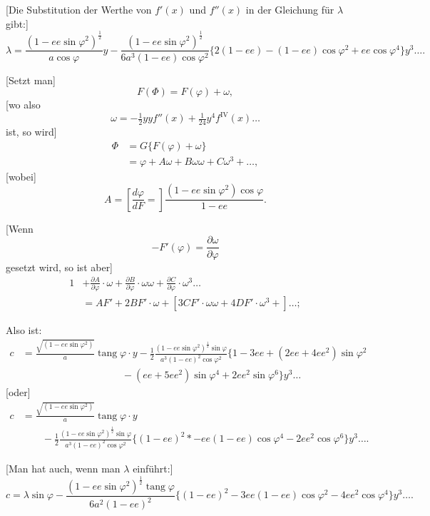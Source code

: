 \documentclass[12pt,a4paper]{article}
\theoremstyle{plain}
\theoremstyle{definition}
\theoremstyle{remark}
\newcommand{\tang}{\operatorname{tang}}
\newcommand{\ee}{\mathit{ee}}
\begin{document}
[Die Substitution der Werthe von $f'(x)$ und $f''(x)$ in der Gleichung für
$\lambda$ gibt:]
\[
\lambda = \frac{(1 - \ee\sin\varphi^2)^{\frac{1}{2}}}{a\cos\varphi}y - \frac{(1 - \ee\sin\varphi^2)^{\frac{1}{2}}}{6a^3(1 - \ee)\cos\varphi^2}\{2(1 - \ee) - (1 - \ee)\cos\varphi^2 + \ee\cos\varphi^4\}y^3 \ldots.
\]

[Setzt man]
\[
F(\Phi) = F(\varphi) + \omega,
\]
[wo also
\[
\omega = -\tfrac{1}{2}yyf''(x) + \tfrac{1}{24}y^4f^{\text{IV}}(x) \ldots
\]
ist, so wird]
\[
\begin{aligned}
\Phi &= G\{F(\varphi) + \omega\} \\
&= \varphi + A\omega + B\omega\omega + C\omega^3 + \ldots,
\end{aligned}
\]
[wobei]
\[
A = \left[\frac{d\varphi}{dF} =\right] \frac{(1 - \ee\sin\varphi^2)\cos\varphi}{1 - \ee}.
\]

[Wenn
\[
-F'(\varphi) = \frac{\partial\omega}{\partial\varphi}
\]
gesetzt wird, so ist aber]
\[
\begin{aligned}
1 &+ \frac{\partial A}{\partial\varphi}\cdot\omega + \frac{\partial B}{\partial\varphi}\cdot\omega\omega + \frac{\partial C}{\partial\varphi}\cdot\omega^3 \ldots \\
&= AF' + 2BF'\cdot\omega + [3CF'\cdot\omega\omega + 4DF'\cdot\omega^3 +] \ldots;
\end{aligned}
\]

\newpage
Also ist:
\[
\begin{aligned}
c &= \frac{\sqrt{(1 - \ee\sin\varphi^2)}}{a}\tang\varphi\cdot y - \tfrac{1}{2}\frac{(1 - \ee\sin\varphi^2)^{\frac{1}{2}}\sin\varphi}{a^3(1 - \ee)^2\cos\varphi^2}\{1 - 3\ee + (2\ee + 4\ee^2)\sin\varphi^2 \\
&\qquad\qquad\qquad\qquad\qquad -(\ee + 5\ee^2)\sin\varphi^4 + 2\ee^2\sin\varphi^6\}y^3 \ldots
\end{aligned}
\]
[oder]
\[
\begin{aligned}
c &= \frac{\sqrt{(1 - \ee\sin\varphi^2)}}{a}\tang\varphi\cdot y \\
&\qquad - \tfrac{1}{2}\frac{(1 - \ee\sin\varphi^2)^{\frac{1}{2}}\sin\varphi}{a^3(1 - \ee)^2\cos\varphi^2}\{(1 - \ee)^2 \ast - \ee(1 - \ee)\cos\varphi^4 - 2\ee^2\cos\varphi^6\}y^3 \ldots.
\end{aligned}
\]

[Man hat auch, wenn man $\lambda$ einführt:]
\[
c = \lambda\sin\varphi - \frac{(1 - \ee\sin\varphi^2)^{\frac{1}{2}}\tang\varphi}{6a^2(1 - \ee)^2}\{(1 - \ee)^2 - 3\ee(1 - \ee)\cos\varphi^2 - 4\ee^2\cos\varphi^4\}y^3 \ldots.
\]
\end{document}
